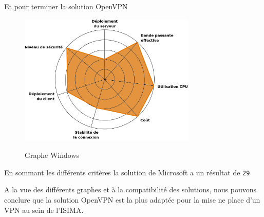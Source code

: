 Et pour terminer la solution OpenVPN

\begin{figure}[H]
	\begin{center}
		\includegraphics[width=0.75\textwidth]{partie_3/images/linux.png}\\
	\end{center}
	\caption{Graphe Windows}
	\label{Graphe Windows}
\end{figure}

En sommant les différents critères la solution de Microsoft a un résultat de \verb|29|


A la vue des différents graphes et à la compatibilité des solutions, nous pouvons conclure que la solution OpenVPN est la plus adaptée pour la mise ne place d'un VPN au sein de l'ISIMA.

